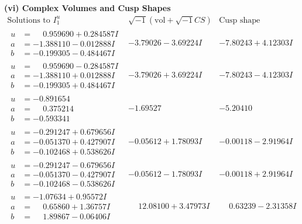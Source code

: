 \documentclass[1p]{elsarticle_modified}
\theoremstyle{definition}
\newcommand{\I}{\sqrt{-1}}
\begin{document}
\newpage\flushleft \textbf{(vi) Complex Volumes and Cusp Shapes}
$$\begin{array}{c|c|c}  
\text{Solutions to }I^u_{1}& \I (\text{vol} + \sqrt{-1}CS) & \text{Cusp shape}\\
 \hline 
\begin{aligned}
u &= \phantom{-}0.959690 + 0.284587 I \\
a &= -1.388110 - 0.012888 I \\
b &= -0.199305 - 0.484467 I\end{aligned}
 & -3.79026 - 3.69224 I & -7.80243 + 4.12303 I \\ \hline\begin{aligned}
u &= \phantom{-}0.959690 - 0.284587 I \\
a &= -1.388110 + 0.012888 I \\
b &= -0.199305 + 0.484467 I\end{aligned}
 & -3.79026 + 3.69224 I & -7.80243 - 4.12303 I \\ \hline\begin{aligned}
u &= -0.891654\phantom{ +0.000000I} \\
a &= \phantom{-}0.375214\phantom{ +0.000000I} \\
b &= -0.593341\phantom{ +0.000000I}\end{aligned}
 & -1.69527\phantom{ +0.000000I} & -5.20410\phantom{ +0.000000I} \\ \hline\begin{aligned}
u &= -0.291247 + 0.679656 I \\
a &= -0.051370 + 0.427907 I \\
b &= -0.102468 + 0.538626 I\end{aligned}
 & -0.05612 + 1.78093 I & -0.00118 - 2.91964 I \\ \hline\begin{aligned}
u &= -0.291247 - 0.679656 I \\
a &= -0.051370 - 0.427907 I \\
b &= -0.102468 - 0.538626 I\end{aligned}
 & -0.05612 - 1.78093 I & -0.00118 + 2.91964 I \\ \hline\begin{aligned}
u &= -1.07634 + 0.95572 I \\
a &= \phantom{-}0.65860 + 1.36757 I \\
b &= \phantom{-}1.89867 - 0.06406 I\end{aligned}
 & \phantom{-}12.08100 + 3.47973 I & \phantom{-}0.63239 - 2.31358 I \\ \hline\begin{aligned}

\end{aligned}
\end{array}$$
\end{document}
